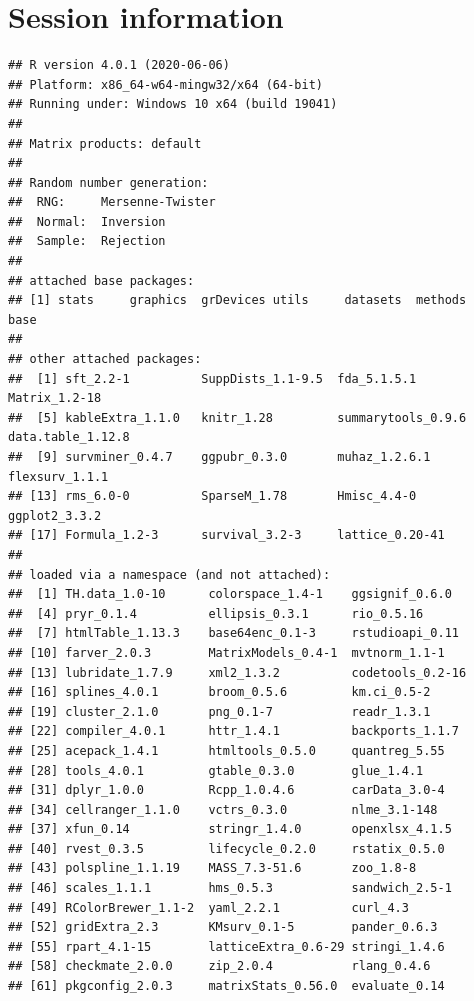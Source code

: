 \documentclass[]{article}
\begin{document}
\newpage

\section{Session information}\label{session-information}

\begin{verbatim}
## R version 4.0.1 (2020-06-06)
## Platform: x86_64-w64-mingw32/x64 (64-bit)
## Running under: Windows 10 x64 (build 19041)
## 
## Matrix products: default
## 
## Random number generation:
##  RNG:     Mersenne-Twister 
##  Normal:  Inversion 
##  Sample:  Rejection 
##  
## attached base packages:
## [1] stats     graphics  grDevices utils     datasets  methods   base     
## 
## other attached packages:
##  [1] sft_2.2-1          SuppDists_1.1-9.5  fda_5.1.5.1        Matrix_1.2-18     
##  [5] kableExtra_1.1.0   knitr_1.28         summarytools_0.9.6 data.table_1.12.8 
##  [9] survminer_0.4.7    ggpubr_0.3.0       muhaz_1.2.6.1      flexsurv_1.1.1    
## [13] rms_6.0-0          SparseM_1.78       Hmisc_4.4-0        ggplot2_3.3.2     
## [17] Formula_1.2-3      survival_3.2-3     lattice_0.20-41   
## 
## loaded via a namespace (and not attached):
##  [1] TH.data_1.0-10      colorspace_1.4-1    ggsignif_0.6.0     
##  [4] pryr_0.1.4          ellipsis_0.3.1      rio_0.5.16         
##  [7] htmlTable_1.13.3    base64enc_0.1-3     rstudioapi_0.11    
## [10] farver_2.0.3        MatrixModels_0.4-1  mvtnorm_1.1-1      
## [13] lubridate_1.7.9     xml2_1.3.2          codetools_0.2-16   
## [16] splines_4.0.1       broom_0.5.6         km.ci_0.5-2        
## [19] cluster_2.1.0       png_0.1-7           readr_1.3.1        
## [22] compiler_4.0.1      httr_1.4.1          backports_1.1.7    
## [25] acepack_1.4.1       htmltools_0.5.0     quantreg_5.55      
## [28] tools_4.0.1         gtable_0.3.0        glue_1.4.1         
## [31] dplyr_1.0.0         Rcpp_1.0.4.6        carData_3.0-4      
## [34] cellranger_1.1.0    vctrs_0.3.0         nlme_3.1-148       
## [37] xfun_0.14           stringr_1.4.0       openxlsx_4.1.5     
## [40] rvest_0.3.5         lifecycle_0.2.0     rstatix_0.5.0      
## [43] polspline_1.1.19    MASS_7.3-51.6       zoo_1.8-8          
## [46] scales_1.1.1        hms_0.5.3           sandwich_2.5-1     
## [49] RColorBrewer_1.1-2  yaml_2.2.1          curl_4.3           
## [52] gridExtra_2.3       KMsurv_0.1-5        pander_0.6.3       
## [55] rpart_4.1-15        latticeExtra_0.6-29 stringi_1.4.6      
## [58] checkmate_2.0.0     zip_2.0.4           rlang_0.4.6        
## [61] pkgconfig_2.0.3     matrixStats_0.56.0  evaluate_0.14      

\end{verbatim}
\end{document}
